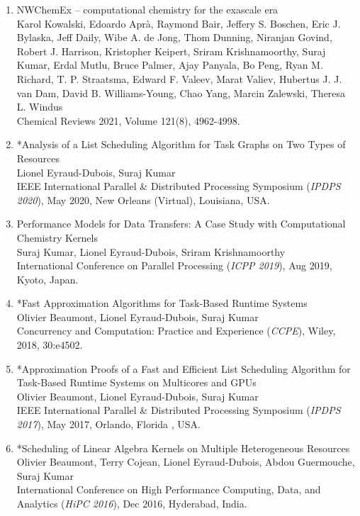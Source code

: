 \documentclass[letterpaper,11pt]{article}
\begin{document}
\begin{enumerate}
	\item NWChemEx -- computational chemistry for the exascale era\\
	Karol Kowalski, Edoardo Aprà, Raymond Bair, Jeffery S. Boschen, Eric J.
	Bylaska, Jeff Daily, Wibe A. de Jong, Thom Dunning, Niranjan Govind, 
	Robert J. Harrison, Kristopher Keipert, Sriram Krishnamoorthy, Suraj Kumar, 
	Erdal Mutlu, Bruce Palmer, Ajay Panyala, Bo Peng, Ryan M. Richard, T. P.
	Straatsma, Edward F. Valeev, Marat Valiev, Hubertus J. J. van Dam, David
	B. Williams-Young, Chao Yang, Marcin Zalewski, Theresa L. Windus\\
	Chemical Reviews 2021, Volume 121(8), 4962-4998.
	
	\item *Analysis of a List Scheduling Algorithm for Task Graphs on Two Types of Resources\\
	Lionel Eyraud-Dubois, Suraj Kumar\\
	IEEE International Parallel \& Distributed Processing Symposium (\textit{IPDPS 2020}), May 2020, New Orleans (Virtual), Louisiana, USA.
	\item Performance Models for Data Transfers: A Case Study with Computational Chemistry Kernels\\
	Suraj Kumar, Lionel Eyraud-Dubois, Sriram Krishnamoorthy\\
	International Conference on Parallel Processing (\textit{ICPP 2019}), Aug 2019, Kyoto, Japan.
	\item *Fast Approximation Algorithms for Task-Based Runtime Systems\\
	Olivier Beaumont, Lionel Eyraud-Dubois, Suraj Kumar\\
	Concurrency and Computation: Practice and Experience (\textit{CCPE}), Wiley, 2018, 30:e4502.
	\item *Approximation Proofs of a Fast and Efficient List Scheduling Algorithm for Task-Based Runtime Systems on Multicores and GPUs\\
	Olivier Beaumont, Lionel Eyraud-Dubois, Suraj Kumar\\
	IEEE International Parallel \& Distributed Processing Symposium (\textit{IPDPS 2017}), May 2017, Orlando, Florida , USA.
	
	\item *Scheduling of Linear Algebra Kernels on Multiple Heterogeneous Resources\\
	Olivier Beaumont, Terry Cojean, Lionel Eyraud-Dubois, Abdou Guermouche, Suraj Kumar\\
	International Conference on High Performance Computing, Data, and Analytics (\textit{HiPC 2016}), Dec 2016, Hyderabad, India.
	

\end{enumerate}
\end{document}
